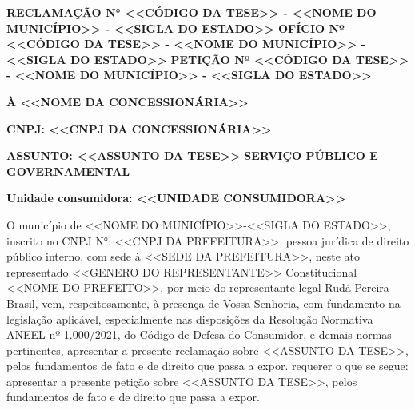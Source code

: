 \ifnum{}
\textbf{RECLAMAÇÃO N° <<CÓDIGO DA TESE>> - <<NOME DO MUNICÍPIO>> - <<SIGLA DO ESTADO>>}
\else
\ifnum{}
\textbf{OFÍCIO Nº <<CÓDIGO DA TESE>> - <<NOME DO MUNICÍPIO>> - <<SIGLA DO ESTADO>>}
\else
\textbf{PETIÇÃO Nº <<CÓDIGO DA TESE>> - <<NOME DO MUNICÍPIO>> - <<SIGLA DO ESTADO>>}
\fi
\fi

\textbf{À <<NOME DA CONCESSIONÁRIA>>}

\textbf{CNPJ: <<CNPJ DA CONCESSIONÁRIA>>}

\ifnum{}
\textbf{ASSUNTO: <<ASSUNTO DA TESE>>}
\else
\textbf{SERVIÇO PÚBLICO E GOVERNAMENTAL}
\fi

\ifnum{}
\textbf{Unidade consumidora: <<UNIDADE CONSUMIDORA>>}
\fi

\vspace{0,25cm}

O município de <<NOME DO MUNICÍPIO>>-<<SIGLA DO ESTADO>>, inscrito no CNPJ N°: <<CNPJ DA PREFEITURA>>, pessoa jurídica de direito público interno, com sede à <<SEDE DA PREFEITURA>>, neste ato representado <<GENERO DO REPRESENTANTE>> Constitucional <<NOME DO PREFEITO>>, por meio do representante legal Rudá Pereira Brasil, vem, respeitosamente, à presença de Vossa Senhoria, com fundamento na legislação aplicável, especialmente nas disposições da Resolução Normativa ANEEL nº 1.000/2021, do Código de Defesa do Consumidor, e demais normas pertinentes,
\ifnum{}
apresentar a presente reclamação sobre <<ASSUNTO DA TESE>>, pelos fundamentos de fato e de direito que passa a expor.
\else
\ifnum{}
requerer o que se segue:
\else
apresentar a presente petição sobre <<ASSUNTO DA TESE>>, pelos fundamentos de fato e de direito que passa a expor.
\fi
\fi
